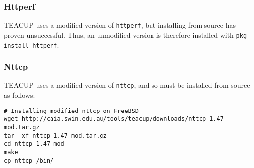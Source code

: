 \subsubsection{Httperf}

TEACUP uses a modified version of \lstinline{httperf}, but installing from source has proven unsuccessful. Thus, an unmodified version is therefore installed with \lstinline{pkg install httperf}.

\subsubsection{Nttcp}

TEACUP uses a modified version of \lstinline{nttcp}, and so must be installed from source as follows:

\begin{lstlisting}
# Installing modified nttcp on FreeBSD
wget http://caia.swin.edu.au/tools/teacup/downloads/nttcp-1.47-mod.tar.gz
tar -xf nttcp-1.47-mod.tar.gz
cd nttcp-1.47-mod
make
cp nttcp /bin/
\end{lstlisting}